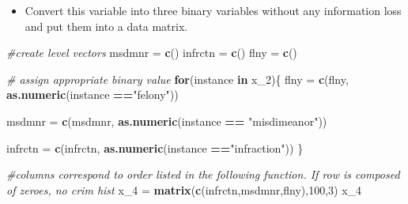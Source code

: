 \documentclass[]{article}
\newenvironment{Shaded}{\begin{snugshade}}{\end{snugshade}}
\newcommand{\KeywordTok}[1]{\textcolor[rgb]{0.13,0.29,0.53}{\textbf{#1}}}
\newcommand{\DecValTok}[1]{\textcolor[rgb]{0.00,0.00,0.81}{#1}}
\newcommand{\StringTok}[1]{\textcolor[rgb]{0.31,0.60,0.02}{#1}}
\newcommand{\CommentTok}[1]{\textcolor[rgb]{0.56,0.35,0.01}{\textit{#1}}}
\newcommand{\ControlFlowTok}[1]{\textcolor[rgb]{0.13,0.29,0.53}{\textbf{#1}}}
\newcommand{\OperatorTok}[1]{\textcolor[rgb]{0.81,0.36,0.00}{\textbf{#1}}}
\newcommand{\NormalTok}[1]{#1}
\providecommand{\tightlist}{%
  \setlength{\itemsep}{0pt}\setlength{\parskip}{0pt}}
\begin{document}
\begin{itemize}
\tightlist
\item
  Convert this variable into three binary variables without any
  information loss and put them into a data matrix.
\end{itemize}

\begin{Shaded}
\begin{Highlighting}[]
\CommentTok{#create level vectors}
\NormalTok{msdmnr =}\StringTok{ }\KeywordTok{c}\NormalTok{()}
\NormalTok{infrctn =}\StringTok{ }\KeywordTok{c}\NormalTok{()}
\NormalTok{flny =}\StringTok{ }\KeywordTok{c}\NormalTok{()}

\CommentTok{# assign appropriate binary value}
\ControlFlowTok{for}\NormalTok{(instance }\ControlFlowTok{in}\NormalTok{ x_}\DecValTok{2}\NormalTok{)\{}
\NormalTok{  flny =}\StringTok{ }\KeywordTok{c}\NormalTok{(flny, }\KeywordTok{as.numeric}\NormalTok{(instance }\OperatorTok{==}\StringTok{"felony"}\NormalTok{))}
  
\NormalTok{  msdmnr =}\StringTok{ }\KeywordTok{c}\NormalTok{(msdmnr, }\KeywordTok{as.numeric}\NormalTok{(instance }\OperatorTok{==}\StringTok{ "misdimeanor"}\NormalTok{))}
  
\NormalTok{  infrctn =}\StringTok{ }\KeywordTok{c}\NormalTok{(infrctn, }\KeywordTok{as.numeric}\NormalTok{(instance }\OperatorTok{==}\StringTok{"infraction"}\NormalTok{))}
\NormalTok{\}}

\CommentTok{#columns correspond to order listed in the following function. If row is composed of zeroes, no crim hist}
\NormalTok{x_}\DecValTok{4}\NormalTok{ =}\StringTok{ }\KeywordTok{matrix}\NormalTok{(}\KeywordTok{c}\NormalTok{(infrctn,msdmnr,flny),}\DecValTok{100}\NormalTok{,}\DecValTok{3}\NormalTok{)}
\NormalTok{x_}\DecValTok{4}
\end{Highlighting}
\end{Shaded}
\end{document}
